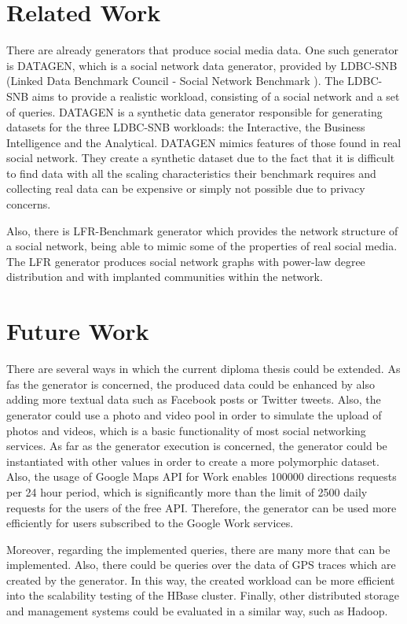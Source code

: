 \section{Related Work}

There are already generators that produce social media data. One such generator is DATAGEN, which is a social network data generator, provided by LDBC-SNB 
(Linked Data Benchmark Council - Social Network Benchmark \cite{26}). The LDBC-SNB aims to provide a realistic workload, consisting of a social network and a set of queries. 
DATAGEN is a synthetic data generator responsible for generating datasets for the three LDBC-SNB workloads: the Interactive, the Business Intelligence and the Analytical. 
DATAGEN mimics features of those found in real social network. They create a synthetic dataset due to the fact that it is difficult to find data with all the 
scaling characteristics their benchmark requires and collecting real data can be expensive or simply not possible due to privacy concerns.

Also, there is LFR-Benchmark generator \cite{27} which provides the network structure of a social network, being able to mimic some of the properties of real 
social media. The LFR generator produces social network graphs with power-law degree distribution and with implanted communities within the network.


\section{Future Work}

There are several ways in which the current diploma thesis could be extended. As fas the generator is concerned, the produced data could be enhanced by also adding more 
textual data such as Facebook posts or Twitter tweets. Also, the generator could use a photo and video pool in order to simulate the upload of photos and videos, 
which is a basic functionality of most social networking services. As far as the generator execution is concerned, the generator could be instantiated with other 
values in order to create a more polymorphic dataset. Also, the usage of Google Maps API for Work enables 100000 directions requests per 24 hour period, which is 
significantly more than the limit of 2500 daily requests for the users of the free API. Therefore, the generator can be used more efficiently for users 
subscribed to the Google Work services. 

Moreover, regarding the implemented queries, there are many more that can be implemented. Also, there could be queries over the data of GPS traces which are 
created by the generator. In this way, the created workload can be more efficient into the scalability testing of the HBase cluster. Finally, other 
distributed storage and management systems could be evaluated in a similar way, such as Hadoop. 
